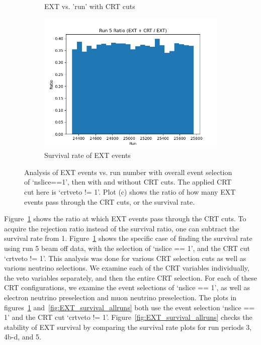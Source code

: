 \begin{figure}[H]
\begin{subfigure}[t]{0.31\linewidth}
        \caption{EXT vs. 'run' with CRT cuts}
    \end{subfigure}%
    \hspace{0.3cm}%
    \begin{subfigure}[t]{0.32\linewidth}
        \includegraphics[width=\linewidth]{technote/EventSelections/FiguresCRT/run5fortalk.png}%
        \caption{Survival rate of EXT events}
    \end{subfigure}
    \caption{Analysis of EXT events vs. run number with overall event selection of `nslice==1', then with and without CRT cuts. The applied CRT cut here is `crtveto != 1'. Plot (c) shows the ratio of how many EXT events pass through the CRT cuts, or the survival rate. }
    \label{fig:EXT_survival_run5}
\end{figure}

Figure~\ref{fig:EXT_survival_run5} shows the ratio at which EXT events pass through the CRT cuts. To acquire the rejection ratio instead of the survival ratio, one can subtract the survival rate from 1. Figure~\ref{fig:EXT_survival_run5} shows the specific case of finding the survival rate using run 5 beam off data, with the selection of `nslice == 1', and the CRT cut `crtveto != 1'. 
This analysis was done for various CRT selection cuts as well as various neutrino selections. We examine each of the CRT variables individually, the veto variables separately, and then the entire CRT selection. For each of these CRT configurations, we examine the event selections of `nslice == 1', as well as electron neutrino preselection and muon neutrino preselection. The plots in figures~\ref{fig:EXT_survival_run5} and~\ref{fig:EXT_survival_allruns} both use the event selection `nslice == 1' and the CRT cut `crtveto != 1'. 
Figure~\ref{fig:EXT_survival_allruns} checks the stability of EXT survival by comparing the survival rate plots for run periods 3, 4b-d, and 5.

